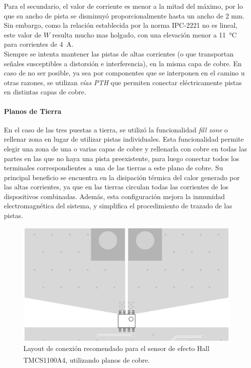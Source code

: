 Para el {\Medium secundario}, el valor de corriente es menor a la mitad del máximo, por lo que su ancho de pista se disminuyó proporcionalmente hasta un {\Medium ancho de 2 mm}. Sin embargo, como la relación establecida por la norma IPC-2221 no es lineal, este valor de $W$ resulta mucho mas holgado, con una elevación menor a \SI{11}{\celsius} para corrientes de \SI[]{4}{\ampere}.\\

Siempre se intenta mantener las pistas de altas corrientes (o que transportan señales susceptibles a distorsión e interferencia), en la misma capa de cobre. En caso de no ser posible, ya sea por componentes que se interponen en el camino u otras razones, se utilizan \textit{vías PTH} que permiten conectar eléctricamente pistas en distintas capas de cobre.\\

\paragraph{Planos de Tierra}

En el caso de las tres puestas a tierra, se utilizó la funcionalidad \textit{fill zone} o rellenar zona en lugar de utilizar pistas individuales. Esta funcionalidad permite elegir una zona de una o varias capas de cobre y rellenarla con cobre en todas las partes en las que no haya una pista preexistente, para luego conectar todos los terminales correspondientes a una de las tierras a este plano de cobre. Su principal beneficio se encuentra en la disipación térmica del calor generado por las altas corrientes, ya que en las tierras circulan todas las corrientes de los dispositivos combinadas. Además, esta configuración mejora la inmunidad electromagnética del sistema, y simplifica el procedimiento de trazado de las pistas.\\

\begin{figure}[h]
    \centering
    \includegraphics[scale=0.25]{Imagenes/Planos TMCS1100.png}
    \caption{Layout de conexión recomendado para el sensor de efecto Hall TMCS1100A4, utilizando planos de cobre.\textsuperscript{\cite{TMCS1100}}}
    \label{plano_tierra_tmcs}
\end{figure}

